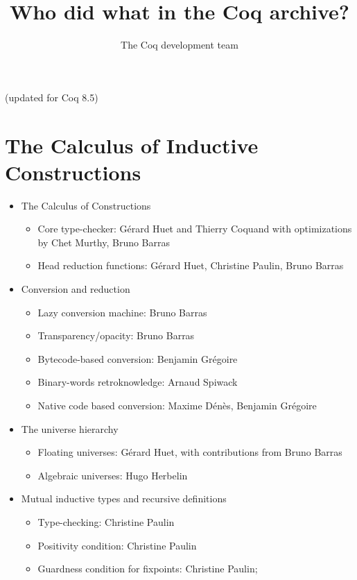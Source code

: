 \documentclass{article}
\begin{document}
\title{Who did what in the Coq archive?}

\author{The Coq development team}

\maketitle

\centerline{(updated for Coq 8.5)}

\section{The Calculus of Inductive Constructions}

\begin{itemize}
\item The Calculus of Constructions
  \begin{itemize}
  \item Core type-checker: Gérard Huet and Thierry Coquand with
    optimizations by Chet Murthy, Bruno Barras
  \item Head reduction functions: Gérard Huet, Christine Paulin, Bruno Barras
  \end{itemize}
\item Conversion and reduction
  \begin{itemize}
  \item Lazy conversion machine: Bruno Barras
  \item Transparency/opacity: Bruno Barras
  \item Bytecode-based conversion: Benjamin Grégoire
  \item Binary-words retroknowledge: Arnaud Spiwack
  \item Native code based conversion: Maxime Dénès, Benjamin Grégoire
  \end{itemize}
\item The universe hierarchy
  \begin{itemize}
  \item Floating universes: Gérard Huet, with contributions from Bruno Barras
  \item Algebraic universes: Hugo Herbelin
  \end{itemize}
\item Mutual inductive types and recursive definitions
  \begin{itemize}
  \item Type-checking: Christine Paulin
  \item Positivity condition: Christine Paulin
  \item Guardness condition for fixpoints: Christine Paulin;

\end{itemize}
\end{itemize}
\end{document}
